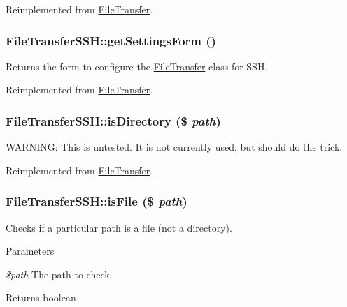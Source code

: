 Reimplemented from \hyperlink{classFileTransfer_aed740d2f6e0780134b2b29a174ad05f2}{FileTransfer}.\hypertarget{classFileTransferSSH_a56142f1f2a4e513a727fb4cc2a029e74}{
\subsubsection[{getSettingsForm}]{\setlength{\rightskip}{0pt plus 5cm}FileTransferSSH::getSettingsForm ()}}
\label{classFileTransferSSH_a56142f1f2a4e513a727fb4cc2a029e74}
Returns the form to configure the \hyperlink{classFileTransfer}{FileTransfer} class for SSH. 

Reimplemented from \hyperlink{classFileTransfer_a3b5e843b16814bdbe43dfecda17bae33}{FileTransfer}.\hypertarget{classFileTransferSSH_aa7bbccd688eb0dcd05684d4f1cceeee1}{
\subsubsection[{isDirectory}]{\setlength{\rightskip}{0pt plus 5cm}FileTransferSSH::isDirectory (\$ {\em path})}}
\label{classFileTransferSSH_aa7bbccd688eb0dcd05684d4f1cceeee1}
WARNING: This is untested. It is not currently used, but should do the trick. 

Reimplemented from \hyperlink{classFileTransfer_a86c4289cfeccacf9bd2bcae8961889ab}{FileTransfer}.\hypertarget{classFileTransferSSH_afa2f90d55ba7e385ec44698d44e48c8a}{
\subsubsection[{isFile}]{\setlength{\rightskip}{0pt plus 5cm}FileTransferSSH::isFile (\$ {\em path})}}
\label{classFileTransferSSH_afa2f90d55ba7e385ec44698d44e48c8a}
Checks if a particular path is a file (not a directory).


\begin{DoxyParams}{Parameters}
\item[{\em \$path}]The path to check\end{DoxyParams}
\begin{DoxyReturn}{Returns}
boolean 
\end{DoxyReturn}


